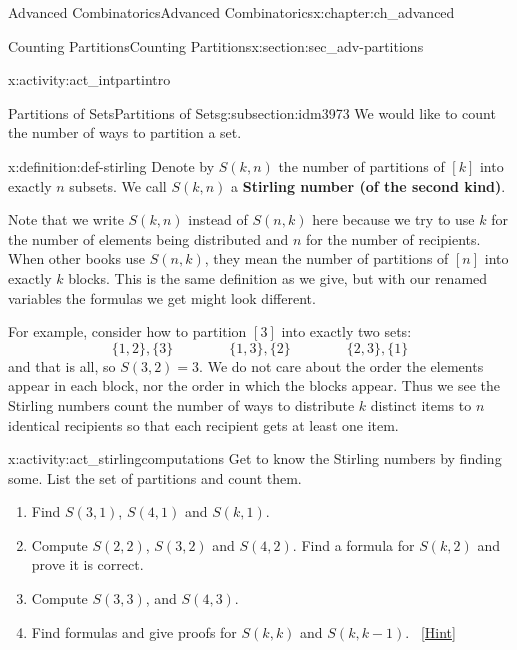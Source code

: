 \documentclass[oneside,10pt,]{book}
\newcommand{\terminology}[1]{\textbf{#1}}
\numberwithin{equation}{chapter}
\begin{document}
\begin{chapterptx}{Advanced Combinatorics}{}{Advanced Combinatorics}{}{}{x:chapter:ch_advanced}
\begin{sectionptx}{Counting Partitions}{}{Counting Partitions}{}{}{x:section:sec_adv-partitions}
\begin{introduction}{}
\begin{activity}{}{x:activity:act_intpartintro}
\begin{enumerate}[font=\bfseries,label=(\alph*),ref=\alph*]
\end{enumerate}
\end{activity}
\end{introduction}%
%
%
\typeout{************************************************}
\typeout{************************************************}
%
\begin{subsectionptx}{Partitions of Sets}{}{Partitions of Sets}{}{}{g:subsection:idm3973}
We would like to count the number of ways to partition a set.%
\begin{definition}{}{x:definition:def-stirling}%
Denote by \(S(k,n)\) the number of partitions of \([k]\) into exactly \(n\) subsets.  We call \(S(k,n)\) a \terminology{Stirling number (of the second kind)}.%
\end{definition}
Note that we write \(S(k,n)\) instead of \(S(n,k)\) here because we try to use \(k\) for the number of elements being distributed and \(n\) for the number of recipients.  When other books use \(S(n,k)\), they mean the number of partitions of \([n]\) into exactly \(k\) blocks.  This is the same definition as we give, but with our renamed variables the formulas we get might look different.%
\par
For example, consider how to partition \([3]\) into exactly two sets:%
\begin{equation*}
\{1,2\}, \{3\} \qquad \qquad \{1,3\},\{2\} \qquad \qquad \{2,3\},\{1\}
\end{equation*}
and that is all, so \(S(3,2) = 3\).  We do not care about the order the elements appear in each block, nor the order in which the blocks appear.  Thus we see the Stirling numbers count the number of ways to distribute \(k\) distinct items to \(n\) identical recipients so that each recipient gets at least one item.%
\begin{activity}{}{x:activity:act_stirlingcomputations}%
Get to know the Stirling numbers by finding some.  List the set of partitions and count them.%
\begin{enumerate}[font=\bfseries,label=(\alph*),ref=\alph*]
\item{}Find \(S(3,1)\), \(S(4,1)\) and \(S(k,1)\).%
\item{}Compute \(S(2,2)\), \(S(3,2)\) and \(S(4,2)\).  Find a formula for \(S(k,2)\) and prove it is correct.%
\item{}Compute \(S(3,3)\), and \(S(4,3)\).%
\item{}Find formulas and give proofs for \(S(k,k)\) and \(S(k,k - 1)\).%
\qquad~\hfill{\tiny\hyperlink{g:hint:idm4024-back}{[Hint]}}\end{enumerate}

\end{activity}
\end{subsectionptx}
\end{sectionptx}
\end{chapterptx}
\end{document}

